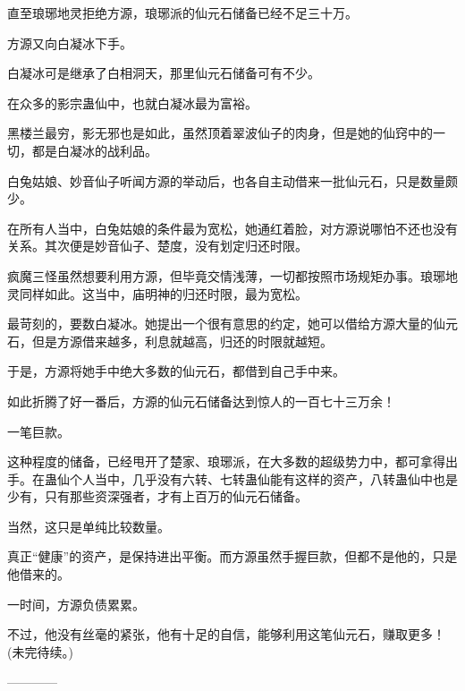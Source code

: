 \begin{this_body}
直至琅琊地灵拒绝方源，琅琊派的仙元石储备已经不足三十万。

方源又向白凝冰下手。

白凝冰可是继承了白相洞天，那里仙元石储备可有不少。

在众多的影宗蛊仙中，也就白凝冰最为富裕。

黑楼兰最穷，影无邪也是如此，虽然顶着翠波仙子的肉身，但是她的仙窍中的一切，都是白凝冰的战利品。

白兔姑娘、妙音仙子听闻方源的举动后，也各自主动借来一批仙元石，只是数量颇少。

在所有人当中，白兔姑娘的条件最为宽松，她通红着脸，对方源说哪怕不还也没有关系。其次便是妙音仙子、楚度，没有划定归还时限。

疯魔三怪虽然想要利用方源，但毕竟交情浅薄，一切都按照市场规矩办事。琅琊地灵同样如此。这当中，庙明神的归还时限，最为宽松。

最苛刻的，要数白凝冰。她提出一个很有意思的约定，她可以借给方源大量的仙元石，但是方源借来越多，利息就越高，归还的时限就越短。

于是，方源将她手中绝大多数的仙元石，都借到自己手中来。

如此折腾了好一番后，方源的仙元石储备达到惊人的一百七十三万余！

一笔巨款。

这种程度的储备，已经甩开了楚家、琅琊派，在大多数的超级势力中，都可拿得出手。在蛊仙个人当中，几乎没有六转、七转蛊仙能有这样的资产，八转蛊仙中也是少有，只有那些资深强者，才有上百万的仙元石储备。

当然，这只是单纯比较数量。

真正“健康”的资产，是保持进出平衡。而方源虽然手握巨款，但都不是他的，只是他借来的。

一时间，方源负债累累。

不过，他没有丝毫的紧张，他有十足的自信，能够利用这笔仙元石，赚取更多！(未完待续。)

------------

\end{this_body}

